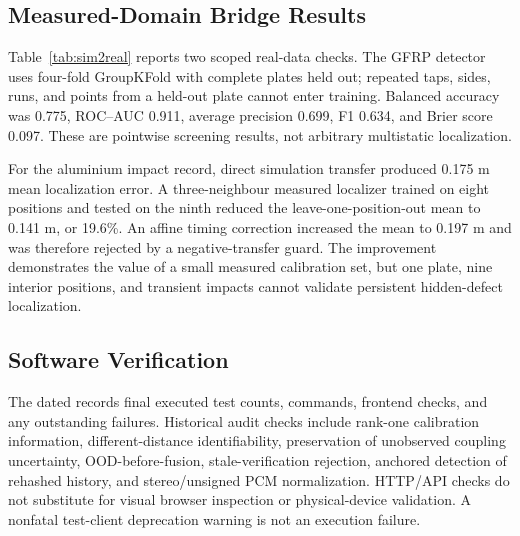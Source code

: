 \documentclass[conference]{IEEEtran}
\begin{document}
\subsection{Measured-Domain Bridge Results}
Table~\ref{tab:sim2real} reports two scoped real-data checks. The GFRP detector uses four-fold GroupKFold with complete plates held out; repeated taps, sides, runs, and points from a held-out plate cannot enter training. Balanced accuracy was 0.775, ROC--AUC 0.911, average precision 0.699, F1 0.634, and Brier score 0.097. These are pointwise screening results, not arbitrary multistatic localization.

For the aluminium impact record, direct simulation transfer produced 0.175 m mean localization error. A three-neighbour measured localizer trained on eight positions and tested on the ninth reduced the leave-one-position-out mean to 0.141 m, or 19.6\%. An affine timing correction increased the mean to 0.197 m and was therefore rejected by a negative-transfer guard. The improvement demonstrates the value of a small measured calibration set, but one plate, nine interior positions, and transient impacts cannot validate persistent hidden-defect localization.

\begin{table}[t]
\caption{Scoped Measured-Domain Bridge Results}
\label{tab:sim2real}
\centering
\small
{}
\end{table}

\subsection{Software Verification}
The dated  records final executed test counts, commands, frontend checks, and any outstanding failures. Historical audit checks include rank-one calibration information, different-distance identifiability, preservation of unobserved coupling uncertainty, OOD-before-fusion, stale-verification rejection, anchored detection of rehashed history, and stereo/unsigned PCM normalization. HTTP/API checks do not substitute for visual browser inspection or physical-device validation. A nonfatal test-client deprecation warning is not an execution failure.
\end{document}
